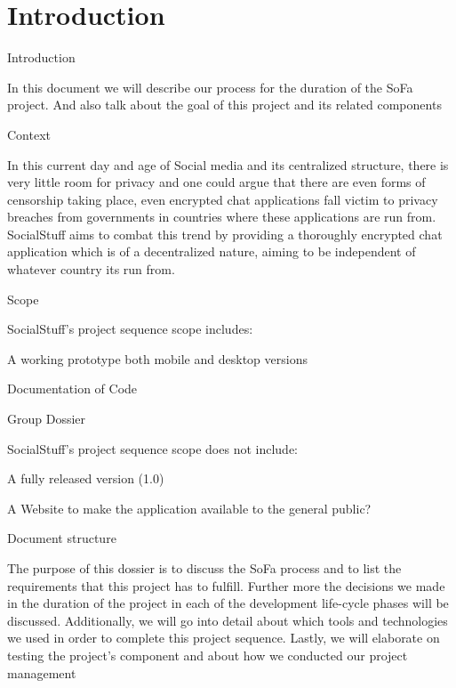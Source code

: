 \chapter{Introduction}
\label{chp:introduction}
Introduction 

In this document we will describe our process for the duration of the SoFa project. And also talk about the goal of this project and its related components 

Context 

In this current day and age of Social media and its centralized structure, there is very little room for privacy and one could argue that there are even forms of censorship taking place, even encrypted chat applications fall victim to privacy breaches from governments in countries where these applications are run from. SocialStuff aims to combat this trend by providing a thoroughly encrypted chat application which is of a decentralized nature, aiming to be independent of whatever country its run from. 

Scope 

SocialStuff’s project sequence scope includes: 

A working prototype both mobile and desktop versions 

Documentation of Code 

Group Dossier 

 

SocialStuff’s project sequence scope does not include: 

A fully released version (1.0) 

A Website to make the application available to the general public? 

 

Document structure 

 

The purpose of this dossier is to discuss the SoFa process and to list the requirements that this project has to fulfill. Further more the decisions we made in the duration of the project in each of the development life-cycle phases will be discussed. Additionally, we will go into detail about which tools and technologies we used in order to complete this project sequence. Lastly, we will elaborate on testing the project’s component and about how we conducted our project management
\lipsum[2-4]
